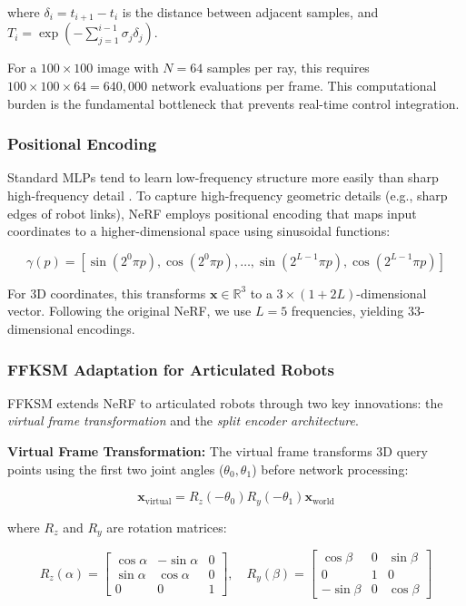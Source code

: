 \documentclass[12pt,a4paper,oneside]{report}
\begin{document}
where $\delta_i = t_{i+1} - t_i$ is the distance between adjacent samples, and $T_i = \exp\left(-\sum_{j=1}^{i-1} \sigma_j \delta_j\right)$.

For a $100 \times 100$ image with $N = 64$ samples per ray, this requires $100 \times 100 \times 64 = 640,000$ network evaluations per frame. This computational burden is the fundamental bottleneck that prevents real-time control integration.

\subsubsection{Positional Encoding}

Standard MLPs tend to learn low-frequency structure more easily than sharp high-frequency detail \cite{rahaman2019spectral}. To capture high-frequency geometric details (e.g., sharp edges of robot links), NeRF employs positional encoding that maps input coordinates to a higher-dimensional space using sinusoidal functions:

\begin{equation}
\gamma(p) = [\sin(2^0 \pi p), \cos(2^0 \pi p), \ldots, \sin(2^{L-1} \pi p), \cos(2^{L-1} \pi p)]
\end{equation}

For 3D coordinates, this transforms $\mathbf{x} \in \mathbb{R}^3$ to a $3 \times (1 + 2L)$-dimensional vector. Following the original NeRF, we use $L = 5$ frequencies, yielding 33-dimensional encodings.

\subsubsection{FFKSM Adaptation for Articulated Robots}

FFKSM extends NeRF to articulated robots through two key innovations: the \textit{virtual frame transformation} and the \textit{split encoder architecture}.

\textbf{Virtual Frame Transformation:} The virtual frame transforms 3D query points using the first two joint angles ($\theta_0, \theta_1$) before network processing:

\begin{equation}
\mathbf{x}_{\text{virtual}} = R_z(-\theta_0) R_y(-\theta_1) \mathbf{x}_{\text{world}}
\end{equation}

where $R_z$ and $R_y$ are rotation matrices:

\begin{equation}
R_z(\alpha) = \begin{bmatrix}
\cos\alpha & -\sin\alpha & 0 \\
\sin\alpha & \cos\alpha & 0 \\
0 & 0 & 1
\end{bmatrix}, \quad
R_y(\beta) = \begin{bmatrix}
\cos\beta & 0 & \sin\beta \\
0 & 1 & 0 \\
-\sin\beta & 0 & \cos\beta
\end{bmatrix}
\end{equation}
\end{document}
